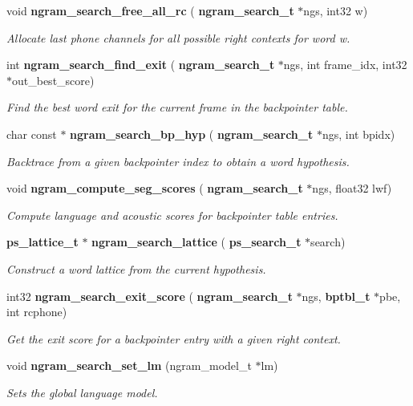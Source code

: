 \begin{DoxyCompactItemize}
\mbox{\label{ngram__search_8h_a15477192481dffcb29e9c4167eff6c3c}} 
void \textbf{ ngram\+\_\+search\+\_\+free\+\_\+all\+\_\+rc} (\textbf{ ngram\+\_\+search\+\_\+t} $\ast$ngs, int32 w)
\begin{DoxyCompactList}\small\item\em Allocate last phone channels for all possible right contexts for word w. \end{DoxyCompactList}\item 
int \textbf{ ngram\+\_\+search\+\_\+find\+\_\+exit} (\textbf{ ngram\+\_\+search\+\_\+t} $\ast$ngs, int frame\+\_\+idx, int32 $\ast$out\+\_\+best\+\_\+score)
\begin{DoxyCompactList}\small\item\em Find the best word exit for the current frame in the backpointer table. \end{DoxyCompactList}\item 
char const  $\ast$ \textbf{ ngram\+\_\+search\+\_\+bp\+\_\+hyp} (\textbf{ ngram\+\_\+search\+\_\+t} $\ast$ngs, int bpidx)
\begin{DoxyCompactList}\small\item\em Backtrace from a given backpointer index to obtain a word hypothesis. \end{DoxyCompactList}\item 
\mbox{\label{ngram__search_8h_a2fa760c99f77eb075157304f4359941e}} 
void \textbf{ ngram\+\_\+compute\+\_\+seg\+\_\+scores} (\textbf{ ngram\+\_\+search\+\_\+t} $\ast$ngs, float32 lwf)
\begin{DoxyCompactList}\small\item\em Compute language and acoustic scores for backpointer table entries. \end{DoxyCompactList}\item 
\mbox{\label{ngram__search_8h_ac30e7dec4bbfeee9f5163abf4bbd1014}} 
\textbf{ ps\+\_\+lattice\+\_\+t} $\ast$ \textbf{ ngram\+\_\+search\+\_\+lattice} (\textbf{ ps\+\_\+search\+\_\+t} $\ast$search)
\begin{DoxyCompactList}\small\item\em Construct a word lattice from the current hypothesis. \end{DoxyCompactList}\item 
\mbox{\label{ngram__search_8h_a25a80e488425b2bd4e24eb753c9295a5}} 
int32 \textbf{ ngram\+\_\+search\+\_\+exit\+\_\+score} (\textbf{ ngram\+\_\+search\+\_\+t} $\ast$ngs, \textbf{ bptbl\+\_\+t} $\ast$pbe, int rcphone)
\begin{DoxyCompactList}\small\item\em Get the exit score for a backpointer entry with a given right context. \end{DoxyCompactList}\item 
void \textbf{ ngram\+\_\+search\+\_\+set\+\_\+lm} (ngram\+\_\+model\+\_\+t $\ast$lm)
\begin{DoxyCompactList}\small\item\em Sets the global language model. \end{DoxyCompactList}\end{DoxyCompactItemize}


